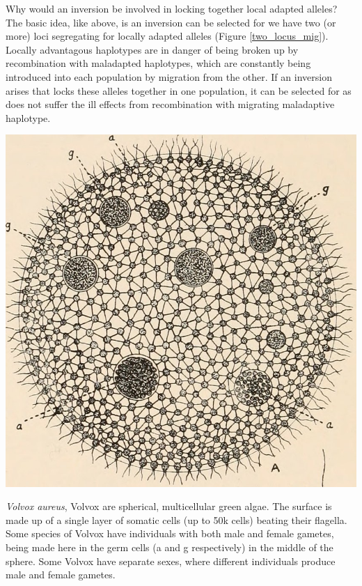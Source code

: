 Why would an inversion be involved in locking together local adapted alleles? The basic idea, like above, is an inversion can be selected for we have two (or more) loci segregating for locally adapted alleles (Figure \ref{two_locus_mig}). Locally advantagous haplotypes are in danger of being broken up by recombination with maladapted haplotypes, which are constantly being
introduced into each population by migration from the other. If an inversion arises that locks these alleles together in one population, it can be selected for as does not suffer the ill effects from recombination with migrating maladaptive haplotype. 
 
  \begin{marginfigure} %
\begin{center}
\includegraphics[width = \textwidth]{illustration_images/multiple_sel_loci/volvox/volvox.jpg}
\end{center}
\caption{ {\it Volvox aureus}, Volvox are spherical, multicellular green algae. The surface is made up of a single layer of somatic cells (up to 50k cells) beating their flagella. Some species of Volvox have individuals with both male and female gametes, being made here in the germ cells (a and g respectively) in the middle of the sphere. Some Volvox have separate sexes, where different individuals produce male and female gametes.}
\end{marginfigure}
